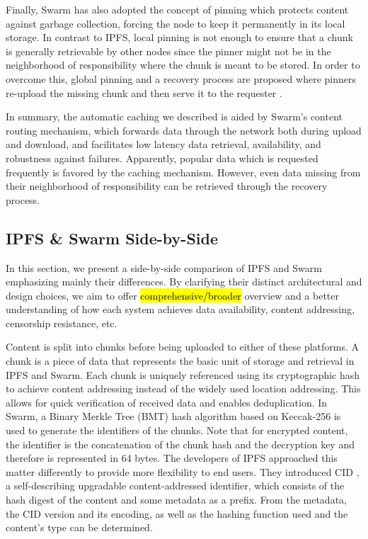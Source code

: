 Finally, Swarm has also adopted the concept of pinning which protects content against garbage collection, forcing the node to keep it permanently in its local storage. In contrast to IPFS, local pinning is not enough to ensure that a chunk is generally retrievable by other nodes since the pinner might not be in the neighborhood of responsibility where the chunk is meant to be stored. In order to overcome this, global pinning and a recovery process are proposed where pinners re-upload the missing chunk and then serve it to the requester \citep[pp.~161--167]{tron_2020}.

In summary, the automatic caching we described is aided by Swarm's content routing mechanism, which forwards data through the network both during upload and download, and facilitates low latency data retrieval, availability, and robustness against failures. Apparently, popular data which is requested frequently is favored by the caching mechanism. However, even data missing from their neighborhood of responsibility can be retrieved through the recovery process.

\subsection{IPFS \& Swarm Side-by-Side}\label{sec:ipfs_vs_swarm}
In this section, we present a side-by-side comparison of IPFS and Swarm emphasizing mainly their differences. By clarifying their distinct architectural and design choices, we aim to offer \hl{comprehensive/broader} overview and a better understanding of how each system achieves data availability, content addressing, censorship resistance, etc.

Content is split into chunks before being uploaded to either of these platforms. A chunk is a piece of data that represents the basic unit of storage and retrieval in IPFS and Swarm. Each chunk is uniquely referenced using its cryptographic hash to achieve content addressing instead of the widely used location addressing. This allows for quick verification of received data and enables deduplication. In Swarm, a Binary Merkle Tree (BMT)  \citep{tron_2020} hash algorithm based on Keccak-256 is used to generate the identifiers of the chunks. Note that for encrypted content, the identifier is the concatenation of the chunk hash and the decryption key and therefore is represented in 64 bytes. The developers of IPFS approached this matter differently to provide more flexibility to end users. They introduced CID  \citep{multiformat}, a self-describing upgradable content-addressed identifier, which consists of the hash digest of the content and some metadata as a prefix. From the metadata, the CID version and its encoding, as well as the hashing function used and the content’s type can be determined.


